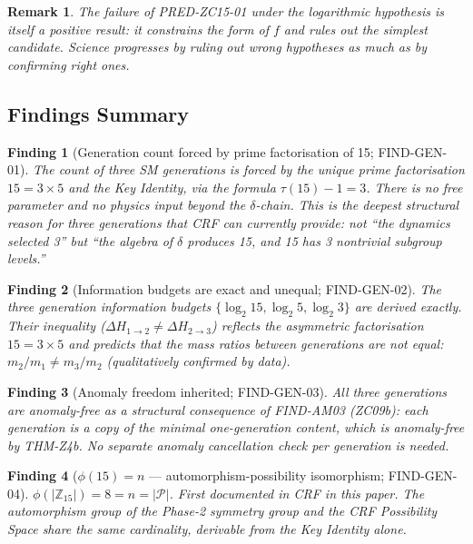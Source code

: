 \documentclass[12pt, a4paper]{article}
\newtheorem{remark}{Remark}[section]
\newtheorem{finding}{Finding}[section]
\begin{document}
\begin{remark}
The failure of PRED-ZC15-01 under the logarithmic hypothesis
is itself a positive result: it \emph{constrains} the form of
$f$ and rules out the simplest candidate. Science progresses
by ruling out wrong hypotheses as much as by confirming right ones.
\end{remark}

\subsection{Findings Summary}
\label{zc15:sec:findings}

\begin{finding}[Generation count forced by prime factorisation
  of 15; FIND-GEN-01]
\label{zc15:find:prime-factor}
The count of three SM generations is forced by the unique prime
factorisation $15 = 3 \times 5$ and the Key Identity, via the
formula $\tau(15) - 1 = 3$. There is no free parameter and no
physics input beyond the $\delta$-chain. This is the deepest
structural reason for three generations that CRF can currently
provide: not ``the dynamics selected 3'' but ``the algebra of
$\delta$ produces 15, and 15 has 3 nontrivial subgroup levels.''
\end{finding}

\begin{finding}[Information budgets are exact and unequal;
  FIND-GEN-02]
The three generation information budgets $\{\log_2 15, \log_2 5,
\log_2 3\}$ are derived exactly. Their inequality
($\Delta H_{1\to 2} \neq \Delta H_{2\to 3}$) reflects the
asymmetric factorisation $15 = 3 \times 5$ and predicts that
the mass ratios between generations are \emph{not equal}:
$m_2/m_1 \neq m_3/m_2$ (qualitatively confirmed by data).
\end{finding}

\begin{finding}[Anomaly freedom inherited; FIND-GEN-03]
All three generations are anomaly-free as a structural consequence
of FIND-AM03 (ZC09b): each generation is a copy of the minimal
one-generation content, which is anomaly-free by THM-Z4b. No
separate anomaly cancellation check per generation is needed.
\end{finding}

\begin{finding}[$\phi(15) = n$ — automorphism-possibility
  isomorphism; FIND-GEN-04]
$\phi(|\mathbb{Z}_{15}|) = 8 = n = |\mathcal{P}|$. First
documented in CRF in this paper. The automorphism group of the
Phase-2 symmetry group and the CRF Possibility Space share the
same cardinality, derivable from the Key Identity alone.
\end{finding}
\end{document}
